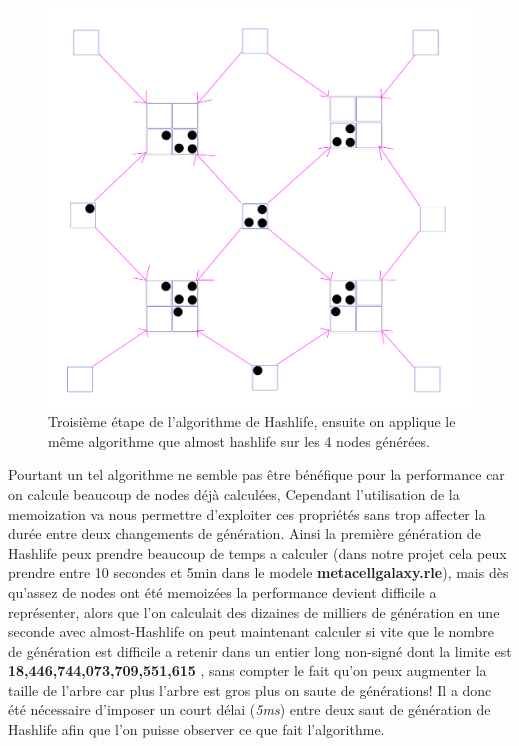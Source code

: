 \begin{figure}[H]
        \center
        \includegraphics[scale=0.1]{images/imgHashlife/HashlifeStep3.png}
        \caption{Troisième étape de l'algorithme de Hashlife, ensuite on applique le même algorithme que almost hashlife sur les 4 nodes générées.}
\end{figure}
Pourtant un tel algorithme ne semble pas être bénéfique pour la performance car on calcule beaucoup de nodes déjà calculées, Cependant l'utilisation de la memoization va nous permettre d'exploiter ces propriétés sans trop affecter la durée entre deux changements de génération. Ainsi la première génération de Hashlife peux prendre beaucoup de temps a calculer (dans notre projet cela peux prendre entre 10 secondes et 5min dans le modele \textbf{metacellgalaxy.rle}), mais dès qu'assez de nodes ont été memoizées la performance devient difficile a représenter, alors que l'on calculait des dizaines de milliers de génération en une seconde avec almost-Hashlife on peut maintenant calculer si vite que le nombre de génération est difficile a retenir dans un entier long non-signé dont la limite est \textbf{18,446,744,073,709,551,615} , sans compter le fait qu'on peux augmenter la taille de l'arbre car plus l'arbre est gros plus on saute de générations! Il a donc été nécessaire d'imposer un court délai (\textit{5ms}) entre deux saut de génération de Hashlife afin que l'on puisse observer ce que fait l'algorithme. 

